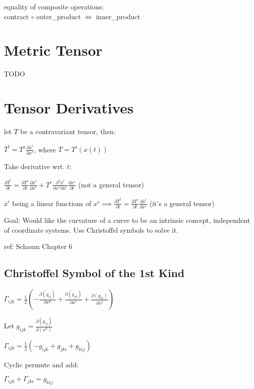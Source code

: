 \documentclass[8pt,letter]{article}
\begin{document}
\begin{multicols*}{2}
  equality of composite operations:\\
  contract $\circ$ outer\_product $\iff$ inner\_product

  \vfill\null
  \pagebreak
  
  \section{Metric Tensor}
  TODO
  
  \vfill\null
  \pagebreak
    
  \section{Tensor Derivatives}
  
  let $T$ be a contravariant tensor, then:

  $\bar{T}^i = T^r \frac{\partial \bar{x}^i}{\partial x^r}$, where $T=T^i(x(t))$

  Take derivative wrt. $t$:

  $\frac{\partial \bar{T}^i}{\partial t} = \frac{\partial T^r}{\partial t} \frac{\partial \bar{x}^i}{\partial x^r} + T^r \frac{\partial^2 \bar{x}^i}{\partial x^s \partial x^r} \frac{\partial x^s}{\partial t}$ (not a general tensor)

  $\bar{x}^i$ being a linear functions of $x^r \implies \frac{\partial \bar{T}^i}{\partial t} = \frac{\partial T^r}{\partial t} \frac{\partial \bar{x}^i}{\partial x^r}$ (it's a general tensor)
  
  Goal: Would like the curvature of a curve to be an intrinsic concept, independent of coordinate systems. Use Christoffel symbols to solve it.

  ref: Schaum Chapter 6
  
  \subsection{Christoffel Symbol of the 1st Kind}

  $\Gamma_{ijk} = \frac{1}{2}\left( - \frac{\partial (g_{ij})}{\partial x^k} + \frac{\partial (g_{jk})}{\partial x^i} + \frac{\partial (g_{ki})}{\partial x^j} \right)$

  Let $g_{ijk}=\frac{\partial(g_{ij})}{\partial(x^k)}$

  $\Gamma_{ijk} = \frac{1}{2}( -g_{ijk} + g_{jki} + g_{kij})$

  Cyclic permute and add:

  $\Gamma_{ijk} + \Gamma_{jki} = g_{kij}$


\end{multicols*}
\end{document}
